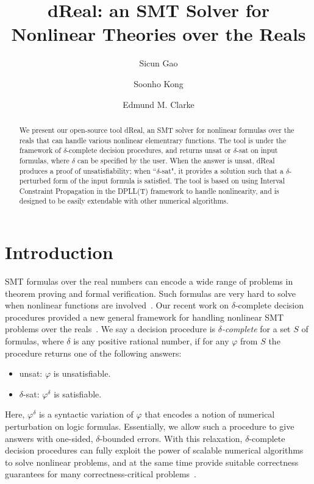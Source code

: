 \documentclass[envcountsect]{llncs}
\title{{\sf dReal}: an SMT Solver for Nonlinear Theories over the Reals}
\author{Sicun Gao \and Soonho Kong \and Edmund M. Clarke}
\institute{Carnegie Mellon University, Pittsburgh, PA 15213}
\begin{document}
\maketitle

\begin{abstract}
We present our open-source tool {\sf dReal}, an SMT solver for
nonlinear formulas over the reals that can handle various nonlinear elementrary
functions. The tool is under the framework of $\delta$-complete decision
procedures, and returns {\sf unsat} or {\sf $\delta$-sat} on input formulas,
where $\delta$ can be specified by the user. When the answer is {\sf unsat},
{\sf dReal} produces a proof of unsatisfiability; when ``$\delta$-sat", it
provides a solution such that a $\delta$-perturbed form of the input formula is
satisfied. The tool is based on using Interval Constraint Propagation in the
DPLL(T) framework to handle nonlinearity, and is
designed to be easily extendable with other numerical algorithms.
\end{abstract}

\section{Introduction}

SMT formulas over the real numbers can encode a wide range of problems in
theorem proving and formal verification. Such formulas are very hard to solve
when nonlinear functions are involved~\cite{}. Our recent work on
{$\delta$-complete decision procedures} provided a new general framework for
handling nonlinear SMT problems over the reals~\cite{}. We say a decision
procedure is {\em $\delta$-complete} for a set $S$ of formulas, where $\delta$
is any positive rational number, if for any $\varphi$ from $S$ the procedure
returns one of the following answers:
\begin{itemize}
 \item {\sf unsat}: $\varphi$ is unsatisfiable.
 \item {\sf $\delta$-sat}: $\varphi^{\delta}$ is satisfiable.
\end{itemize}
Here, $\varphi^{\delta}$ is a syntactic variation of $\varphi$ that encodes a
notion of numerical perturbation on logic formulas. Essentially, we allow such a
procedure to give answers with one-sided, $\delta$-bounded errors. With this
relaxation, $\delta$-complete decision procedures can fully exploit the
power of scalable numerical algorithms to solve nonlinear
problems, and at the same time provide suitable correctness
guarantees for many correctness-critical problems~\cite{}.
\end{document}

